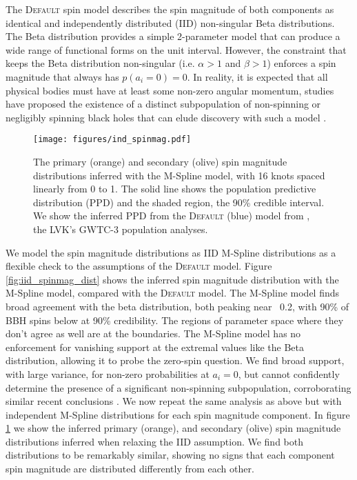 The \textsc{Default} spin model describes the spin magnitude of both components as identical and independently distributed (IID) non-singular Beta distributions. 
The Beta distribution provides a simple 2-parameter model that can produce a wide range of functional forms on the unit interval. However, the constraint that keeps 
the Beta distribution non-singular (i.e. $\alpha>1$ and $\beta>1$) enforces a spin magnitude that always has $p(a_i=0) = 0$. In reality, it is expected that 
all physical bodies must have at least some non-zero angular momentum, studies have proposed the existence of a distinct subpopulation of non-spinning or 
negligibly spinning black holes that can elude discovery with such a model \citep{FullerMa2019,RouletGWTC2Pop,BuildBetterSpinModels,Callister_NoEvidence,GWTC3MonashSpin}. 

\begin{figure} 
    \begin{centering}
        \texttt{[image: figures/ind\_spinmag.pdf]}
        \caption{The primary (orange) and secondary (olive) spin magnitude distributions inferred with the M-Spline model, 
        with 16 knots spaced linearly from 0 to 1. The solid line shows the population predictive distribution (PPD) and the shaded region, the 90\% credible interval. 
        We show the inferred PPD from the \textsc{Default} (blue) model from \citet{o3b_astro_dist}, the LVK's GWTC-3 population analyses.}
        \label{fig:ind_spinmag_dist}
    \end{centering}
\end{figure}

We model the spin magnitude distributions as IID M-Spline distributions as a flexible check
to the assumptions of the \textsc{Default} model. Figure \ref{fig:iid_spinmag_dist} shows the inferred spin magnitude distribution with the M-Spline model, 
compared with the \textsc{Default} model. The M-Spline model finds broad agreement with the beta distribution, both peaking near ~0.2, with 90\% 
of BBH spins below \result{$\CIPlusMinus{\macros[MSplineIIDCompSpins][a_90percentile]}$} at 90\% credibility. The regions of parameter space where they don't agree as well are at 
the boundaries. The M-Spline model has no enforcement for vanishing support at the extremal values like the Beta distribution, 
allowing it to probe the zero-spin question. We find broad support, with large variance, for non-zero probabilities at $a_i=0$, but cannot confidently determine the presence of 
a significant non-spinning subpopulation, corroborating similar recent conclusions \citep{BuildBetterSpinModels,Callister_NoEvidence,GWTC3MonashSpin}. 
We now repeat the same analysis as above but with independent M-Spline distributions for each spin magnitude component. In figure \ref{fig:ind_spinmag_dist} 
we show the inferred primary (orange), and secondary (olive) spin magnitude distributions inferred when relaxing the IID assumption. We find both 
distributions to be remarkably similar, showing no signs that each component spin magnitude are distributed differently from each other.

